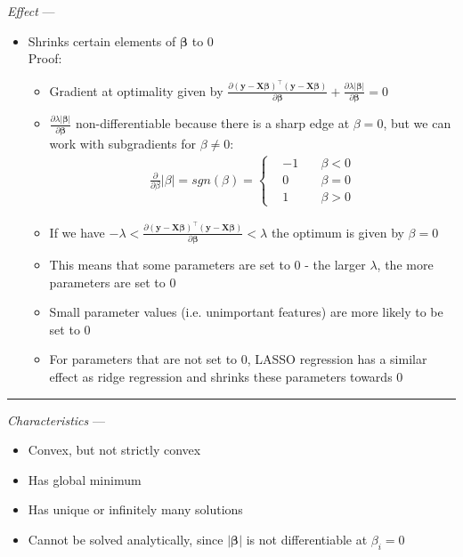\emph{Effect} ---
\begin{itemize}
    \item Shrinks certain elements of $\boldsymbol{\beta}$ to 0\\
    Proof:
    \begin{itemize}
        \item Gradient at optimality given by $\frac{\partial ( \boldsymbol{y} - \boldsymbol{X}\boldsymbol{\beta})^\intercal( \boldsymbol{y} - \boldsymbol{X}\boldsymbol{\beta} )}{\partial \boldsymbol{\beta}} + \frac{\partial \lambda  |\boldsymbol{\beta}|}{\partial \boldsymbol{\beta}} = 0$
        \item $\frac{\partial \lambda  |\boldsymbol{\beta}|}{\partial \boldsymbol{\beta}}$ non-differentiable because there is a sharp edge at $\beta = 0$, but we can work with subgradients for $\beta \neq 0$:
        \begin{align*}
        \frac{\partial}{\partial \beta} | \beta | = sgn(\beta) = 
        \left\{
            \begin{aligned}
                 & -1 \quad & \beta < 0 \\
                 & 0 \quad & \beta = 0 \\
                 & 1 \quad & \beta > 0   
            \end{aligned}
        \right.
        \end{align*}
        \item If we have $-\lambda < \frac{\partial ( \boldsymbol{y} - \boldsymbol{X}\boldsymbol{\beta})^\intercal( \boldsymbol{y} - \boldsymbol{X}\boldsymbol{\beta} )}{\partial \boldsymbol{\beta}} < \lambda$ the optimum is given by $\beta = 0$
        \item This means that some parameters are set to $0$ - the larger $\lambda$, the more parameters are set to $0$
        \item Small parameter values (i.e. unimportant features) are more likely to be set to $0$
        \item For parameters that are not set to $0$, LASSO regression has a similar effect as ridge regression and shrinks these parameters towards $0$
    \end{itemize}
\end{itemize}

{\color{lightgray}\hrule height 0.001mm}

\emph{Characteristics} --- 
\begin{itemize}
    \item Convex, but not strictly convex
    \item Has global minimum
    \item Has unique or infinitely many solutions
    \item Cannot be solved analytically, since $|\boldsymbol{\beta}|$ is not differentiable at $\beta_i = 0$
\end{itemize}